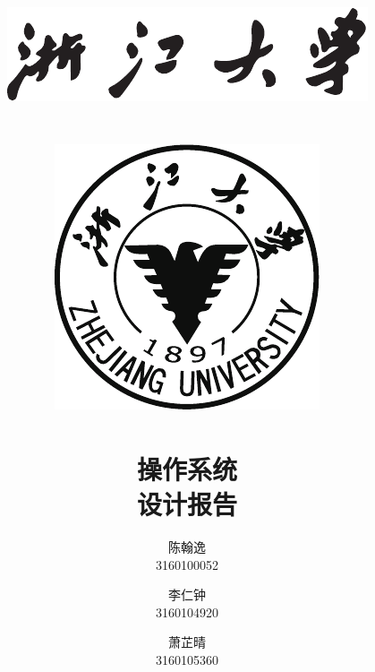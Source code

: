 \pagestyle{fancy}
\lhead{\leftmark}
\renewcommand{\headrulewidth}{0.5pt}

\title{
	\includegraphics[scale=1.5]{img/zju_1.pdf}\\~\\
	\includegraphics[scale=1]{img/zju_2.pdf}\\
	~\\
	\Huge{操作系统}\\
	\large{设计报告}
}

\author{
陈翰逸 \\ 3160100052
\and
李仁钟 \\ 3160104920 
\and
萧芷晴 \\ 3160105360 
}
